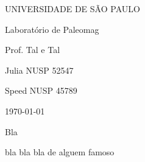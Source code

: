 \documentclass[a4paper,oneside]{report}
\begin{document}
\begin{titlepage}

\begin{center}

{
    \large UNIVERSIDADE DE SÃO PAULO
}

\vspace{5cm}

{
    \LARGE Laboratório de Paleomag
    
}

\vspace{3cm}


Prof. Tal e Tal

\vspace{3cm}

Julia NUSP 52547

Speed NUSP 45789

\vfill

\today

\end{center}
\end{titlepage}


Bla

\begin{flushright}
\vfill
bla bla bla de alguem famoso

\end{flushright}
\end{document}
